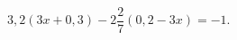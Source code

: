 \begin{ex}[type=equation]
	\begin{condition}
		$3,2(3x + 0,3) - 2\dfrac{2}{7}(0,2 - 3x) = -1.$
	\end{condition}
\end{ex}